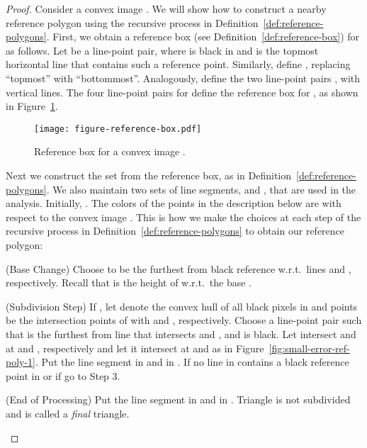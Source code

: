 \documentclass[11pt,english]{article}
\renewenvironment{enumerate}[1]{\begin{compactenum}#1}{\end{compactenum}}
\numberwithin{figure}{section}
\begin{document}
\begin{proof}
Consider a convex image . We will show how to construct a nearby reference polygon  using the recursive process in Definition~\ref{def:reference-polygons}. First, we obtain a reference box (see Definition~\ref{def:reference-box}) for  as follows. Let  be a line-point pair, where  is black in  and  is the topmost horizontal line that contains such a reference point. Similarly, define , replacing ``topmost'' with ``bottommost''. Analogously, define the two line-point pairs ,  with vertical lines. The four line-point pairs  for  define the reference box for , as shown in Figure~\ref{fig:reference-box}.

\begin{figure}[ht]
\centering
\texttt{[image: figure-reference-box.pdf]}
\caption{ Reference box for a convex image .}
\label{fig:reference-box}
\end{figure}




Next we construct the set  from the reference box, as in Definition~\ref{def:reference-polygons}.  We also maintain two sets of line segments,  and , that are used in the analysis. Initially, . The colors of the points in the description below are with respect to the convex image . This is how we make the choices at each step of the recursive process in Definition~\ref{def:reference-polygons} to obtain our reference polygon:
\begin{enumerate}
\item {\sf (Base Change)} Choose  to be the furthest from  black reference w.r.t.\ lines  and , respectively. Recall that  is the height of  w.r.t.\ the base .

\item {\sf (Subdivision Step)} If , let  denote the convex hull of all black pixels in  and points  be the intersection points of  with  and , respectively. Choose a line-point pair  such that  is the furthest from  line that intersects  and ,  and  is black.  Let  intersect  and  at  and , respectively and let it intersect  at  and  as in Figure~\ref{fig:small-error-ref-poly-1}. Put the line segment  in  and  in . If no line in  contains a black reference point in  or if  go to Step 3.

\item {\sf (End of Processing)} Put the line segment  in  and  in . Triangle  is not subdivided and is called a {\em final} triangle.
\end{enumerate}




\end{proof}
\end{document}
